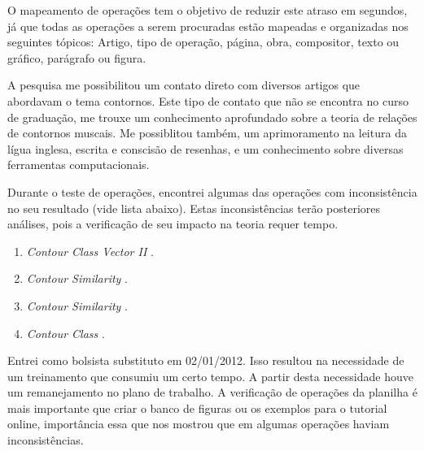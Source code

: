 \documentclass[11pt]{article}
\newcommand{\eng}[1]{\textit{#1}}
\begin{document}
O mapeamento de operações tem o objetivo de reduzir este atraso em
segundos, já que todas as operações a serem procuradas estão mapeadas
e organizadas nos seguintes tópicos: Artigo, tipo de operação, página,
obra, compositor, texto ou gráfico, parágrafo ou figura.

A pesquisa me possibilitou um contato direto com diversos artigos que abordavam
o tema contornos. Este tipo de contato que não se encontra no curso de graduação,
me trouxe um conhecimento aprofundado sobre a teoria de relações de contornos muscais.
Me possiblitou também, um aprimoramento na leitura da lígua inglesa, escrita e conscisão
de resenhas, e um conhecimento sobre diversas ferramentas computacionais.

Durante o teste de operações, encontrei algumas das operações com
inconsistência no seu resultado (vide lista abaixo). Estas inconsistências terão posteriores
análises, pois a verificação de seu impacto na teoria requer tempo.

\begin{enumerate}
\item \eng{Contour Class Vector II} \cite[p. 241]{Friedmann1985}.
\item \eng{Contour Similarity} \cite[p. 242]{Quinn1997}.
\item \eng{Contour Similarity} \cite[p. 262]{Quinn1997}.
\item \eng{Contour Class} \cite[p. 113]{Schultz2008}.
\end{enumerate}

Entrei como bolsista substituto em 02/01/2012. Isso resultou na
necessidade de um treinamento que consumiu um certo tempo. A partir
desta necessidade houve um remanejamento no plano de trabalho. A
verificação de operações da planilha é mais importante que criar o
banco de figuras ou os exemplos para o tutorial online, importância
essa que nos mostrou que em algumas operações haviam inconsistências.


\renewcommand{\refname}{Referências bibliográficas (máximo 15)}

\nocite{
  Friedmann1985,
  Friedmann1987,
  Morris1987,
  Marvin1987,
  Marvin1988,
  Polansky1992,
  Morris1993,
  Clifford1995,
  Quinn1997,
  Beard2003,
  Sampaio2008,
  Schultz2008,
  Schultz2009,
  Bor2009
}





\end{document}
